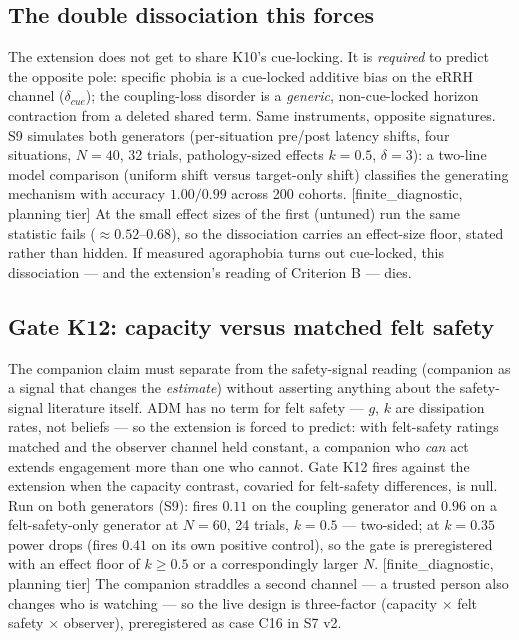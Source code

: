 \documentclass[9pt,twocolumn]{article}
\newcommand{\eRRH}{\mathrm{eRRH}}
\newcommand{\tier}[1]{{\sffamily\scriptsize\color{RRHMSlate}[#1]}}
\begin{document}
\subsection{The double dissociation this forces}
The extension does not get to share K10's cue-locking. It is \emph{required} to predict the opposite pole: specific phobia is a cue-locked additive bias on the $\eRRH$ channel ($\delta_{cue}$); the coupling-loss disorder is a \emph{generic}, non-cue-locked horizon contraction from a deleted shared term. Same instruments, opposite signatures. S9 simulates both generators (per-situation pre/post latency shifts, four situations, $N=40$, 32 trials, pathology-sized effects $k=0.5$, $\delta=3$): a two-line model comparison (uniform shift versus target-only shift) classifies the generating mechanism with accuracy $1.00/0.99$ across 200 cohorts. \tier{finite\_diagnostic, planning tier} At the small effect sizes of the first (untuned) run the same statistic fails ($\approx0.52$--$0.68$), so the dissociation carries an effect-size floor, stated rather than hidden. If measured agoraphobia turns out cue-locked, this dissociation --- and the extension's reading of Criterion B --- dies.

\subsection{Gate K12: capacity versus matched felt safety}
The companion claim must separate from the safety-signal reading (companion as a signal that changes the \emph{estimate}) without asserting anything about the safety-signal literature itself. ADM has no term for felt safety --- $g$, $k$ are dissipation rates, not beliefs --- so the extension is forced to predict: with felt-safety ratings matched and the observer channel held constant, a companion who \emph{can} act extends engagement more than one who cannot. Gate K12 fires against the extension when the capacity contrast, covaried for felt-safety differences, is null. Run on both generators (S9): fires $0.11$ on the coupling generator and $0.96$ on a felt-safety-only generator at $N=60$, 24 trials, $k=0.5$ --- two-sided; at $k=0.35$ power drops (fires $0.41$ on its own positive control), so the gate is preregistered with an effect floor of $k\ge0.5$ or a correspondingly larger $N$. \tier{finite\_diagnostic, planning tier} The companion straddles a second channel --- a trusted person also changes who is watching --- so the live design is three-factor (capacity $\times$ felt safety $\times$ observer), preregistered as case C16 in S7 v2.
\end{document}
